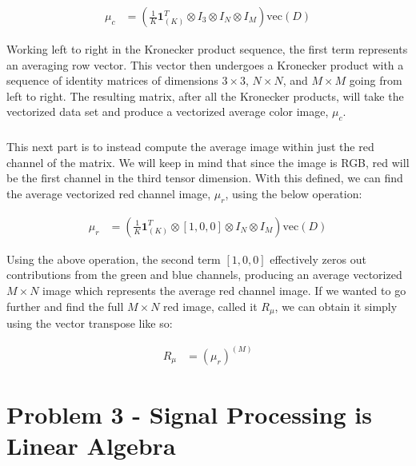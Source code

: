 \documentclass{article}[12pt]
\begin{document}
	\begin{align*}
	\mu_c &= \left(\frac{1}{K}\boldsymbol{1}_{(K)}^{T} \otimes I_3 \otimes I_N \otimes I_M\right) \text{vec}(D)
	\end{align*}
	
	Working left to right in the Kronecker product sequence, the first term represents an averaging row vector. This vector then undergoes a Kronecker product with a sequence of identity matrices of dimensions $3 \times 3$, $N \times N$, and $M \times M$ going from left to right. The resulting matrix, after all the Kronecker products, will take the vectorized data set and produce a vectorized average color image, $\mu_c$.
	
	\subsubsection{}
	This next part is to instead compute the average image within just the red channel of the matrix. We will keep in mind that since the image is RGB, red will be the first channel in the third tensor dimension. With this defined, we can find the average vectorized red channel image, $\mu_r$,  using the below operation:
	
	\begin{align*}
	\mu_r &= \left(\frac{1}{K}\boldsymbol{1}_{(K)}^{T} \otimes [1,0,0] \otimes I_N \otimes I_M\right) \text{vec}(D)
	\end{align*}

Using the above operation, the second term $[1, 0, 0]$ effectively zeros out contributions from the green and blue channels, producing an average vectorized $M \times N$ image which represents the average red channel image. If we wanted to go further and find the full $M \times N$ red image, called it $R_{\mu}$, we can obtain it simply using the vector transpose like so:

\begin{align*}
R_{\mu} &= \left(\mu_r\right)^{(M)}
\end{align*}

\newpage
\section{Problem 3 - Signal Processing is Linear Algebra}
\end{document}
